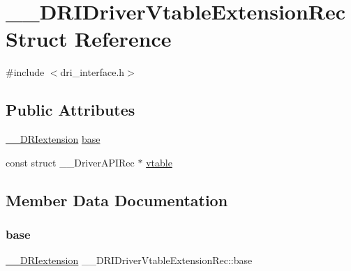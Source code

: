 \hypertarget{struct_____d_r_i_driver_vtable_extension_rec}{}\section{\+\_\+\+\_\+\+D\+R\+I\+Driver\+Vtable\+Extension\+Rec Struct Reference}
\label{struct_____d_r_i_driver_vtable_extension_rec}


{\ttfamily \#include $<$dri\+\_\+interface.\+h$>$}

\subsection*{Public Attributes}
\begin{DoxyCompactItemize}
\item 
\hyperlink{dri__interface_8h_a4e0a61c8ece00d2b2c6792a9a1b55385}{\+\_\+\+\_\+\+D\+R\+Iextension} \hyperlink{struct_____d_r_i_driver_vtable_extension_rec_a80617a0d091c4f53347a8dfda3d05374}{base}
\item 
const struct \+\_\+\+\_\+\+Driver\+A\+P\+I\+Rec $\ast$ \hyperlink{struct_____d_r_i_driver_vtable_extension_rec_aca2f3c223f4e7df2e9feb778fc1a764e}{vtable}
\end{DoxyCompactItemize}


\subsection{Member Data Documentation}
\mbox{\label{struct_____d_r_i_driver_vtable_extension_rec_a80617a0d091c4f53347a8dfda3d05374}} 
\subsubsection{\texorpdfstring{base}{base}}
{\footnotesize\ttfamily \hyperlink{dri__interface_8h_a4e0a61c8ece00d2b2c6792a9a1b55385}{\+\_\+\+\_\+\+D\+R\+Iextension} \+\_\+\+\_\+\+D\+R\+I\+Driver\+Vtable\+Extension\+Rec\+::base}

\mbox{\label{struct_____d_r_i_driver_vtable_extension_rec_aca2f3c223f4e7df2e9feb778fc1a764e}} 
